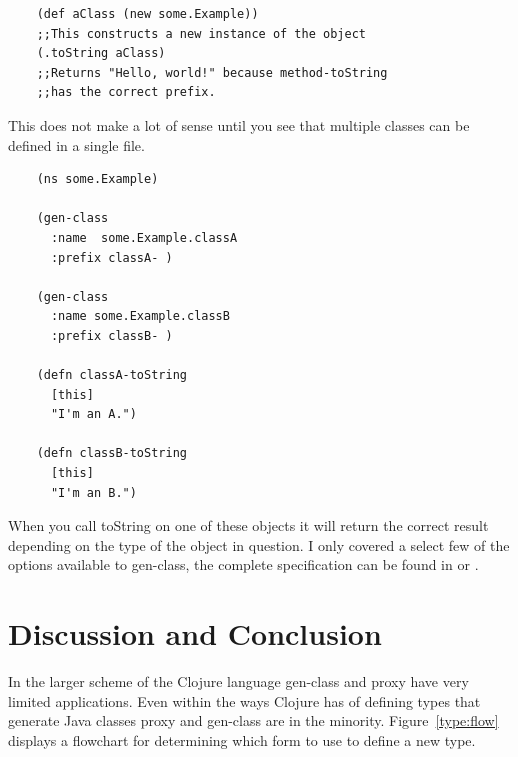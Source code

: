 \documentclass[12pt]{article}
\begin{document}
	\begin{verbatim}
	(def aClass (new some.Example))
	;;This constructs a new instance of the object
	(.toString aClass)
	;;Returns "Hello, world!" because method-toString 
	;;has the correct prefix.
	\end{verbatim}
	
	This does not make a lot of sense until you see that multiple classes can be defined in a single file.
	
	\begin{verbatim}
	(ns some.Example)
	
	(gen-class
	  :name  some.Example.classA
	  :prefix classA- )
	  
	(gen-class
	  :name some.Example.classB
	  :prefix classB- )
	  
	(defn classA-toString
	  [this]
	  "I'm an A.")
	  
    (defn classB-toString
	  [this]
	  "I'm an B.")
	\end{verbatim}
	
	When you call toString on one of these objects it will return the correct result depending on the type of the object in question. I only covered a select few of the options available to gen-class, the complete specification can be found in \cite{docs:genClass} or \cite{api:genClass}. 

		
\section{Discussion and Conclusion}\label{sec:sugg}
	In the larger scheme of the Clojure language gen-class and proxy have very limited applications. Even within the ways Clojure has of defining types that generate Java classes proxy and gen-class are in the minority. Figure~\ref{type:flow} displays a  flowchart for determining which form to use to define a new type.
	
\end{document}
